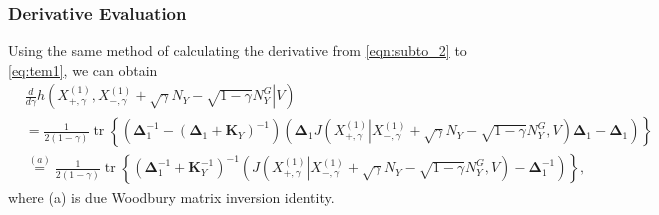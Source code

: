 \documentclass[journal,final, onecolumn]{IEEEtran}
\DeclareMathOperator{\tr}{tr}
\begin{document}
\subsubsection{Derivative Evaluation}
Using the same method of calculating the derivative from \eqref{eqn:subto_2} to \eqref{eq:tem1}, we can obtain
\begin{align}
& \frac{d}{d\gamma} h\left(\left.X^{(1)}_{+, \gamma}, X^{(1)}_{-, \gamma}+\sqrt{\gamma}N_{Y} - \sqrt{1-\gamma}N_{Y}^{G} \right| V \right)\nonumber \\
& = \frac{1}{2(1-\gamma)} \tr \left\{  \left(   \boldsymbol{\Delta}_{1}^{-1} - \left( \boldsymbol{\Delta}_{1} + \boldsymbol{K}_{Y}  \right)^{-1}        \right) \left(       \boldsymbol{\Delta}_{1} J \left(  \left. X^{(1)}_{+, \gamma}  \right| X^{(1)}_{-, \gamma}+\sqrt{\gamma}N_{Y} - \sqrt{1-\gamma}N_{Y}^{G}, V  \right)   \boldsymbol{\Delta}_{1} - \boldsymbol{\Delta}_{1}   \right)                          \right\} \\
& \overset{(a)}= \frac{1}{2(1-\gamma)} \tr \left\{   \left( \boldsymbol{\Delta}^{-1}_{1} + \boldsymbol{K}^{-1}_{Y}  \right)^{-1}\left(  J \left(  \left. X^{(1)}_{+, \gamma}  \right| X^{(1)}_{-, \gamma}+\sqrt{\gamma}N_{Y} - \sqrt{1-\gamma}N_{Y}^{G}, V  \right) - \boldsymbol{\Delta}^{-1}_{1}  \right)           \right\},
\end{align}
where (a) is due Woodbury matrix inversion identity.
\end{document}

